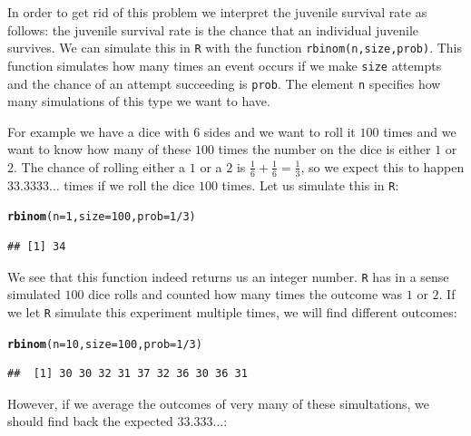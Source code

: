 \documentclass{article}\usepackage[]{graphicx}\usepackage[]{color}
\makeatletter
\newcommand{\hlnum}[1]{\textcolor[rgb]{0.686,0.059,0.569}{#1}}%
\newcommand{\hlopt}[1]{\textcolor[rgb]{0,0,0}{#1}}%
\newcommand{\hlstd}[1]{\textcolor[rgb]{0.345,0.345,0.345}{#1}}%
\newcommand{\hlkwc}[1]{\textcolor[rgb]{0.333,0.667,0.333}{#1}}%
\newcommand{\hlkwd}[1]{\textcolor[rgb]{0.737,0.353,0.396}{\textbf{#1}}}%
\newenvironment{kframe}{%
 \def\at@end@of@kframe{}%
 \ifinner\ifhmode%
  \def\at@end@of@kframe{\end{minipage}}%
  \begin{minipage}{\columnwidth}%
 \fi\fi%
 \def\FrameCommand##1{\hskip\@totalleftmargin \hskip-\fboxsep
 \colorbox{shadecolor}{##1}\hskip-\fboxsep
     \hskip-\linewidth \hskip-\@totalleftmargin \hskip\columnwidth}%
 \MakeFramed {\advance\hsize-\width
   \@totalleftmargin\z@ \linewidth\hsize
   \@setminipage}}%
 {\par\unskip\endMakeFramed%
 \at@end@of@kframe}
\newenvironment{knitrout}{}{} %
\makeatother
\begin{document}
In order to get rid of this problem we interpret the juvenile survival rate as follows: the juvenile survival rate is the chance that an individual juvenile survives. We can simulate this in \texttt{R} with the function \texttt{rbinom(n,size,prob)}. This function simulates how many times an event occurs if we make \texttt{size} attempts and the chance of an attempt succeeding is \texttt{prob}. The element \texttt{n} specifies how many simulations of this type we want to have.

For example we have a dice with 6 sides and we want to roll it $100$ times and we want to know how many of these $100$ times the number on the dice is either $1$ or $2$. The chance of rolling either a $1$ or a $2$ is $\frac{1}{6}+\frac{1}{6}=\frac{1}{3}$, so we expect this to happen $33.3333\dots$ times if we roll the dice $100$ times. Let us simulate this in \texttt{R}:
\begin{knitrout}
\color{fgcolor}\begin{kframe}
\begin{alltt}
\hlkwd{rbinom}\hlstd{(}\hlkwc{n}\hlstd{=}\hlnum{1}\hlstd{,}\hlkwc{size}\hlstd{=}\hlnum{100}\hlstd{,}\hlkwc{prob}\hlstd{=}\hlnum{1}\hlopt{/}\hlnum{3}\hlstd{)}
\end{alltt}
\begin{verbatim}
## [1] 34
\end{verbatim}
\end{kframe}
\end{knitrout}
We see that this function indeed returns us an integer number. \texttt{R} has in a sense simulated $100$ dice rolls and counted how many times the outcome was $1$ or $2$. If we let \texttt{R} simulate this experiment multiple times, we will find different outcomes:
\begin{knitrout}
\color{fgcolor}\begin{kframe}
\begin{alltt}
\hlkwd{rbinom}\hlstd{(}\hlkwc{n}\hlstd{=}\hlnum{10}\hlstd{,}\hlkwc{size}\hlstd{=}\hlnum{100}\hlstd{,}\hlkwc{prob}\hlstd{=}\hlnum{1}\hlopt{/}\hlnum{3}\hlstd{)}
\end{alltt}
\begin{verbatim}
##  [1] 30 30 32 31 37 32 36 30 36 31
\end{verbatim}
\end{kframe}
\end{knitrout}
However, if we average the outcomes of very many of these simultations, we should find back the expected $33.333\dots$:
\end{document}
